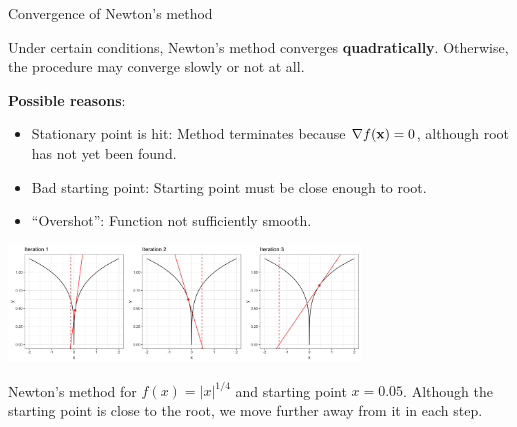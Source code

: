 \begin{vbframe}{Convergence of Newton's method}

Under certain conditions, Newton's method converges \textbf{quadratically}. Otherwise, the procedure may converge slowly or not at all.

\vspace*{0.2cm}

\textbf{Possible reasons}:

\begin{itemize}
\item Stationary point is hit: Method terminates because $\nabla f(\mathbf{x})= 0$, although root has not yet been found.
\item Bad starting point: Starting point must be close enough to root.
\item \enquote{Overshot}: Function not sufficiently smooth. 
\end{itemize}

\begin{center}
\includegraphics[width=0.7\textwidth]{figure_man/newtonfail1.png} \\
\begin{footnotesize} Newton's method for $f(x) = |x|^{1/4}$ and starting point $x = 0.05$. Although the starting point is close to the root, we move further away from it in each step.\end{footnotesize}
\end{center}

\end{vbframe}

\endlecture



